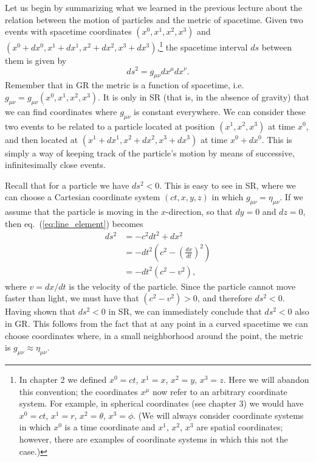 \documentclass[11pt, a4paper,oneside,openright]{book}
\numberwithin{equation}{section}
\begin{document}
Let us begin by summarizing what we learned in the previous lecture about the relation between the motion of particles and the metric of spacetime. Given two events with spacetime coordinates $(x^0,x^1,x^2,x^3)$ and $(x^0+dx^0,x^1+dx^1,x^2+dx^2,x^3+dx^3)$,\footnote{In chapter 2 we defined $x^0=ct$, $x^1=x$, $x^2=y$, $x^3=z$. Here we will abandon this convention; the coordinates $x^{\mu}$ now refer to an arbitrary coordinate system. For example, in spherical coordinates (see chapter 3) we would have $x^0=ct$, $x^1=r$, $x^2=\theta$, $x^3=\phi$. (We will always consider coordinate systems in which $x^0$ is a time coordinate and $x^1$, $x^2$, $x^3$ are spatial coordinates; however, there are examples of coordinate systems in which this not the case.)} the spacetime interval $ds$ between them is given by
\begin{equation} \label{eq:line_element}
ds^2=g_{\mu\nu}dx^{\mu}dx^{\nu}.
\end{equation}
Remember that in GR the metric is a function of spacetime, i.e.\ $g_{\mu\nu}=g_{\mu\nu}(x^0,x^1,x^2,x^3)$. It is only in SR (that is, in the absence of gravity) that we can find coordinates where $g_{\mu\nu}$ is constant everywhere. We can consider these two events to be related to a particle located at position $(x^1,x^2,x^3)$ at time $x^0$, and then located at $(x^1+dx^1,x^2+dx^2,x^3+dx^3)$ at time $x^0+dx^0$. This is simply a way of keeping track of the particle's motion by means of successive, infinitesimally close events.

Recall that for a particle we have $ds^2<0$. This is easy to see in SR, where we can choose a Cartesian coordinate system $(ct,x,y,z)$ in which $g_{\mu\nu}=\eta_{\mu\nu}$. If we assume that the particle is moving in the $x$-direction, so that $dy=0$ and $dz=0$, then eq.\ (\ref{eq:line_element}) becomes
\begin{equation}
\begin{split}
ds^2&=-c^2dt^2+dx^2\\
&=-dt^2\left(c^2-\left(\frac{dx}{dt}\right)^2\right)\\
&=-dt^2\left(c^2-v^2\right),
\end{split}
\end{equation}
where $v=dx/dt$ is the velocity of the particle. Since the particle cannot move faster than light, we must have that $(c^2-v^2)>0$, and therefore $ds^2<0$. Having shown that $ds^2<0$ in SR, we can immediately conclude that $ds^2<0$ also in GR. This follows from the fact that at any point in a curved spacetime we can choose coordinates where, in a small neighborhood around the point, the metric is $g_{\mu\nu}\approx\eta_{\mu\nu}$.
\end{document}
